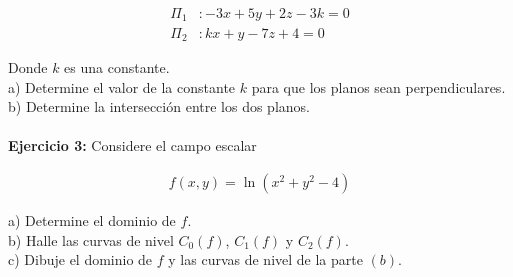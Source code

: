\documentclass{article}
\theoremstyle{definition}
\begin{document}
\begin{align*}
    \Pi_1 &: -3x+5y+2z-3k = 0 \\
    \Pi_2 &: kx+ y-7z +4 =0
\end{align*}

Donde $k$ es una constante. \\

a)  Determine el valor de la constante $k$ para que los planos sean perpendiculares. \\ 

b) Determine la intersección entre los dos planos. \\ \\ 


\textbf{Ejercicio 3:} Considere el campo escalar

\begin{align*}
    f(x,y) = \ln(x^2+y^2-4)
\end{align*}

a) Determine el dominio de $f$. \\

b) Halle las curvas de nivel  $C_0(f)$, $C_1(f)$ y $C_2(f)$. \\

c) Dibuje el dominio de $f$ y las curvas de nivel de la parte $(b)$.
\end{document}
